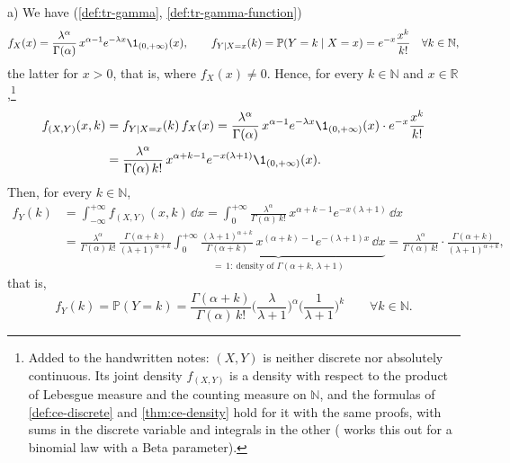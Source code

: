 \begin{example}
a) We have (\cref{def:tr-gamma}, \cref{def:tr-gamma-function})
\[
  f_X(x)=\frac{\lambda^\alpha}{\Gamma(\alpha)}\,x^{\alpha-1}e^{-\lambda x}\1_{(0,+\infty)}(x),\qquad
  f_{Y\mid X=x}(k)=\mathbb P(Y=k\mid X=x)=e^{-x}\frac{x^k}{k!}\quad\forall k\in\mathbb N,
\]
the latter for $x>0$, that is, where $f_X(x)\ne0$. Hence, for every $k\in\mathbb N$ and
$x\in\mathbb R$,\footnote{Added to the handwritten notes: $(X,Y)$ is neither discrete nor
absolutely continuous. Its joint density $f_{(X,Y)}$ is a density with respect to the product of
Lebesgue measure and the counting measure on $\mathbb N$, and the formulas of
\cref{def:ce-discrete} and \cref{thm:ce-density} hold for it with the same proofs, with sums in the
discrete variable and integrals in the other ( works this out for a
binomial law with a Beta parameter).}
\[
\begin{aligned}
  f_{(X,Y)}(x,k)&=f_{Y\mid X=x}(k)\,f_X(x)=\frac{\lambda^\alpha}{\Gamma(\alpha)}\,x^{\alpha-1}e^{-\lambda x}\1_{(0,+\infty)}(x)\cdot e^{-x}\frac{x^k}{k!}\\
  &=\frac{\lambda^\alpha}{\Gamma(\alpha)\,k!}\,x^{\alpha+k-1}e^{-x(\lambda+1)}\1_{(0,+\infty)}(x).
\end{aligned}
\]
Then, for every $k\in\mathbb N$,
\[
\begin{aligned}
  f_Y(k)&=\int_{-\infty}^{+\infty}f_{(X,Y)}(x,k)\,\dd x=\int_0^{+\infty}\frac{\lambda^\alpha}{\Gamma(\alpha)\,k!}\,x^{\alpha+k-1}e^{-x(\lambda+1)}\,\dd x\\
  &=\frac{\lambda^\alpha}{\Gamma(\alpha)\,k!}\,\frac{\Gamma(\alpha+k)}{(\lambda+1)^{\alpha+k}}
  \underbrace{\int_0^{+\infty}\frac{(\lambda+1)^{\alpha+k}}{\Gamma(\alpha+k)}\,x^{(\alpha+k)-1}e^{-(\lambda+1)x}\,\dd x}_{=\,1:\ \text{density of }\Gamma(\alpha+k,\,\lambda+1)}
  =\frac{\lambda^\alpha}{\Gamma(\alpha)\,k!}\cdot\frac{\Gamma(\alpha+k)}{(\lambda+1)^{\alpha+k}},
\end{aligned}
\]
that is,
\begin{equation}\label{eq:cp-negative-binomial}
  f_Y(k)=\mathbb P(Y=k)=\frac{\Gamma(\alpha+k)}{\Gamma(\alpha)\,k!}\Big(\frac\lambda{\lambda+1}\Big)^\alpha\Big(\frac1{\lambda+1}\Big)^k
  \qquad\forall k\in\mathbb N .
\end{equation}


\end{example}

